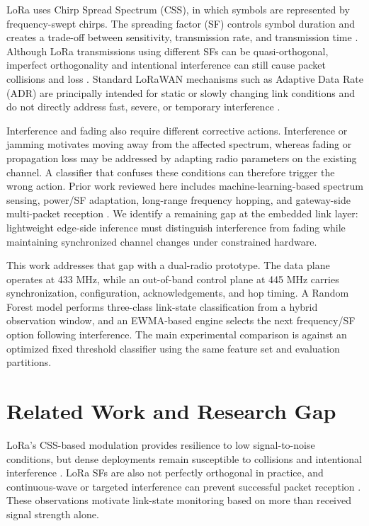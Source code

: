 \documentclass[10pt,a4paper]{article}
\begin{document}
LoRa uses Chirp Spread Spectrum (CSS), in which symbols are represented by frequency-swept chirps. The spreading factor (SF) controls symbol duration and creates a trade-off between sensitivity, transmission rate, and transmission time \cite{augustin,reddy}. Although LoRa transmissions using different SFs can be quasi-orthogonal, imperfect orthogonality and intentional interference can still cause packet collisions and loss \cite{augustin,reddy,croce}. Standard LoRaWAN mechanisms such as Adaptive Data Rate (ADR) are principally intended for static or slowly changing link conditions and do not directly address fast, severe, or temporary interference \cite{reddy}.

Interference and fading also require different corrective actions. Interference or jamming motivates moving away from the affected spectrum, whereas fading or propagation loss may be addressed by adapting radio parameters on the existing channel. A classifier that confuses these conditions can therefore trigger the wrong action. Prior work reviewed here includes machine-learning-based spectrum sensing, power/SF adaptation, long-range frequency hopping, and gateway-side multi-packet reception \cite{jha,reynders,bukhari,wang}. We identify a remaining gap at the embedded link layer: lightweight edge-side inference must distinguish interference from fading while maintaining synchronized channel changes under constrained hardware.

This work addresses that gap with a dual-radio prototype. The data plane operates at 433 MHz, while an out-of-band control plane at 445 MHz carries synchronization, configuration, acknowledgements, and hop timing. A Random Forest model performs three-class link-state classification from a hybrid observation window, and an EWMA-based engine selects the next frequency/SF option following interference. The main experimental comparison is against an optimized fixed threshold classifier using the same feature set and evaluation partitions.

\section{Related Work and Research Gap}
LoRa's CSS-based modulation provides resilience to low signal-to-noise conditions, but dense deployments remain susceptible to collisions and intentional interference \cite{augustin,croce,haque}. LoRa SFs are also not perfectly orthogonal in practice, and continuous-wave or targeted interference can prevent successful packet reception \cite{croce,haque}. These observations motivate link-state monitoring based on more than received signal strength alone.
\end{document}
